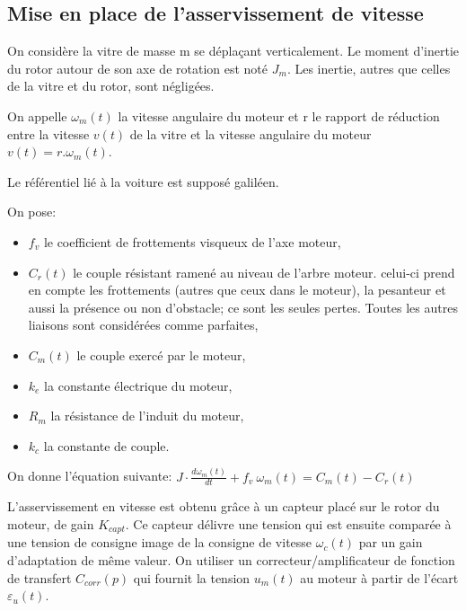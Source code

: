 \subsection{Mise en place de l'asservissement de vitesse}

On considère la vitre de masse m se déplaçant verticalement. Le moment d'inertie du rotor autour de son axe de rotation est noté $J_m$. Les inertie, autres que celles de la vitre et du rotor, sont négligées.

On appelle $\omega_m(t)$ la vitesse angulaire du moteur et r le rapport de réduction entre la vitesse $v(t)$ de la vitre et la vitesse angulaire du moteur $v(t)=r.\omega_m(t)$.

Le référentiel lié à la voiture est supposé galiléen.

On pose:
\begin{itemize}
 \item $f_v$ le coefficient de frottements visqueux de l'axe moteur,
 \item $C_r(t)$ le couple résistant ramené au niveau de l'arbre moteur. celui-ci prend en compte les frottements (autres que ceux dans le moteur), la pesanteur et aussi la présence ou non d'obstacle; ce sont les seules pertes. Toutes les autres liaisons sont considérées comme parfaites,
 \item $C_m(t)$ le couple exercé par le moteur,
 \item $k_e$ la constante électrique du moteur,
 \item $R_m$ la résistance de l'induit du moteur,
 \item $k_c$ la constante de couple. 
\end{itemize}

On donne l'équation suivante: $J\cdot \frac{d\omega_m(t)}{dt}+f_v\ \omega_m(t)=C_m(t)-C_r(t)$



L'asservissement en vitesse est obtenu grâce à un capteur placé sur le rotor du moteur, de gain $K_{capt}$. Ce capteur délivre une tension qui est ensuite comparée à une tension de consigne image de la consigne de vitesse $\omega_c(t)$ par un gain d'adaptation de même valeur. On utiliser un correcteur/amplificateur de fonction de transfert $C_{corr}(p)$ qui fournit la tension $u_m(t)$ au moteur à partir de l'écart $\varepsilon_u(t)$.

